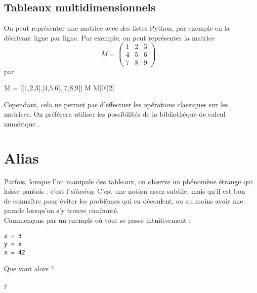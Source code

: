 \subsection{Tableaux multidimensionnels}

On peut représenter une matrice avec des listes Python, par exemple en la décrivant ligne par 
ligne. 
Par exemple, on peut représenter la matrice 
\begin{equation*}
  M=\begin{pmatrix}
    1&2&3 \\ 4&5&6 \\ 7&8&9
  \end{pmatrix}
\end{equation*}
par
\begin{pyconsole}
M = [[1,2,3],[4,5,6],[7,8,9]]
M
M[0][2]
\end{pyconsole}
Cependant, cela ne permet pas d'effectuer les opérations classiques sur les matrices. On préférera 
utiliser les possibilités de la bibliothèque de calcul numérique .

\section{Alias}

Parfois, lorsque l'on manipule des tableaux, on observe un phénomène étrange qui laisse pantois : 
c'est l'\emph{aliasing}. C'est une notion assez subtile, mais qu'il est bon de connaître pour 
éviter les problèmes qui en découlent, ou au moins avoir une parade lorsqu'on s'y trouve 
confronté.\\


Commençons par un exemple où tout se passe intuitivement :
\begin{lstlisting}
x = 3
y = x
x = 42
\end{lstlisting}

Que vaut alors  ? 
\begin{pyconsole}
y
\end{pyconsole}

